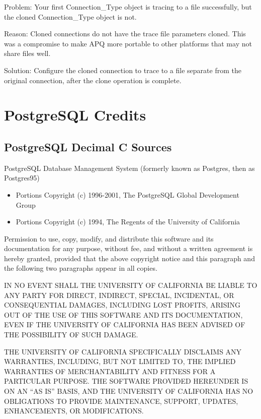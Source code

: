 \documentclass[english,letterpaper]{book}
\begin{document}
Problem: Your first Connection\_Type object is tracing to a file successfully,
but the cloned Connection\_Type object is not.

Reason: Cloned connections do not have the trace file parameters cloned.
This was a compromise to make APQ more portable to other platforms
that may not share files well.

Solution: Configure the cloned connection to trace to a file separate
from the original connection, after the clone operation is complete.


\appendix
\chapter{PostgreSQL Credits}

\section*{PostgreSQL Decimal C Sources}

PostgreSQL Database Management System (formerly known as Postgres,
then as Postgres95)

\begin{itemize}
\item Portions Copyright (c) 1996-2001, The PostgreSQL Global Development
Group
\item Portions Copyright (c) 1994, The Regents of the University of California
\end{itemize}
Permission to use, copy, modify, and distribute this software and
its documentation for any purpose, without fee, and without a written
agreement is hereby granted, provided that the above copyright notice
and this paragraph and the following two paragraphs appear in all
copies.

IN NO EVENT SHALL THE UNIVERSITY OF CALIFORNIA BE LIABLE TO ANY PARTY
FOR DIRECT, INDIRECT, SPECIAL, INCIDENTAL, OR CONSEQUENTIAL DAMAGES,
INCLUDING LOST PROFITS, ARISING OUT OF THE USE OF THIS SOFTWARE AND
ITS DOCUMENTATION, EVEN IF THE UNIVERSITY OF CALIFORNIA HAS BEEN ADVISED
OF THE POSSIBILITY OF SUCH DAMAGE.

THE UNIVERSITY OF CALIFORNIA SPECIFICALLY DISCLAIMS ANY WARRANTIES,
INCLUDING, BUT NOT LIMITED TO, THE IMPLIED WARRANTIES OF MERCHANTABILITY
AND FITNESS FOR A PARTICULAR PURPOSE. THE SOFTWARE PROVIDED HEREUNDER
IS ON AN ``AS IS'' BASIS, AND THE UNIVERSITY OF CALIFORNIA
HAS NO OBLIGATIONS TO PROVIDE MAINTENANCE, SUPPORT, UPDATES, ENHANCEMENTS,
OR MODIFICATIONS.
\end{document}
